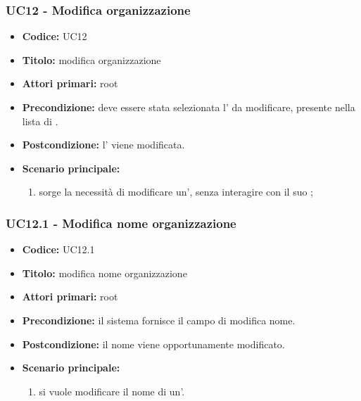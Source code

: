 \documentclass[casi-duso]{subfiles}
\begin{document}
\subsubsection{UC12 - Modifica organizzazione}
\label{subsub:UC12}
\begin{itemize}
  \item \textbf{Codice:} UC12
  \item \textbf{Titolo:} modifica organizzazione
  \item \textbf{Attori primari:} root
  \item \textbf{Precondizione:} deve essere stata selezionata l' da modificare, presente nella lista di .
  \item \textbf{Postcondizione:} l' viene modificata.
  \item \textbf{Scenario principale:}
  \begin{enumerate}
    \item sorge la necessità di modificare un', senza interagire con il suo ;
  \end{enumerate}
\end{itemize}

\subsubsection{UC12.1 - Modifica nome organizzazione}
\label{subsub:UC12.1}
\begin{itemize}
  \item \textbf{Codice:} UC12.1
  \item \textbf{Titolo:} modifica nome organizzazione
  \item \textbf{Attori primari:} root
  \item \textbf{Precondizione:} il sistema fornisce il campo di modifica nome.
  \item \textbf{Postcondizione:} il nome viene opportunamente modificato.
  \item \textbf{Scenario principale:} 
  \begin{enumerate}
    \item si vuole modificare il nome di un'.
  \end{enumerate}
  
\end{itemize}
\end{document}
